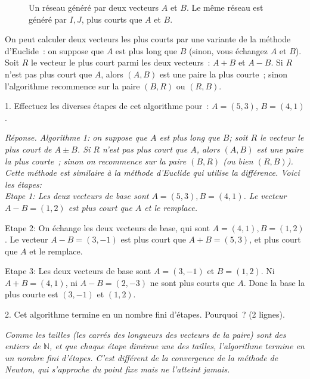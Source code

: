 \documentclass[11pt]{article}
\def\N{\mathbb N}
\begin{document}
{{\begin{figure}
\caption{\label{reseau} Un réseau  généré par deux vecteurs $A$ et $B$. Le même réseau est  généré par $I, J$, plus courts que $A$ et $B$. }
\end{figure}
}


On peut calculer
deux vecteurs les plus courts 
par une variante de la méthode d'Euclide~:
on suppose que $A$ est plus long que $B$ (sinon, vous échangez $A$ et $B$).  Soit $R$ le vecteur le plus court parmi  les deux vecteurs~: 
$A + B$ et $A -B$.
Si $R$ n'est pas plus court que $A$, alors $(A, B)$ est une
paire la plus courte~; sinon l'algorithme recommence sur la paire $(B, R)$ ou $(R, B)$. 

1. Effectuez  les diverses étapes de cet algorithme pour~:
$A=(5, 3)$, $B=(4,1)$.


{
\ifcorrige

\medskip

{\it Réponse.
Algorithme 1: on suppose que $A$ est plus long que $B$;  soit $R$ le vecteur le plus court de  $A \pm B$. Si $R$ n'est pas plus court que $A$, alors $(A, B)$ est une paire la plus courte~; sinon on recommence sur la paire $(B, R)$ (ou bien $(R, B)$). 
Cette méthode est similaire à la méthode d'Euclide qui utilise la différence.
Voici les étapes:  \\

Etape 1: Les deux vecteurs de base sont $A=(5, 3), B=(4, 1)$. Le vecteur $A-B= (1, 2)$ est plus court que $A$ et le remplace. 

Etape 2: On échange les deux vecteurs de base, qui sont $A=(4, 1), B=(1, 2)$. Le vecteur  $A-B=(3, -1)$
est plus court que $A+B=(5, 3)$, et plus court que $A$ et le remplace.

Etape 3: Les deux vecteurs de base sont $A=(3,-1)$ et $B=(1, 2)$. Ni $A+B=(4,1)$, ni $A-B=(2, -3)$ ne sont plus courts que $A$. Donc la base la plus courte est $(3,-1)$ et $(1, 2)$.

\medskip

\else
\fi


}
}

{
2. Cet algorithme termine en un nombre fini d'étapes. Pourquoi~? (2 lignes). 

{
\ifcorrige
\medskip

{\it Comme les tailles (les carrés des longueurs des vecteurs de la paire) sont des entiers de $\N$, et que chaque étape
diminue une des tailles, l'algorithme termine en un nombre fini d'étapes.
C'est différent de la convergence de la méthode de Newton, qui s'approche du point fixe mais ne l'atteint jamais.
}

}}}
\end{document}
